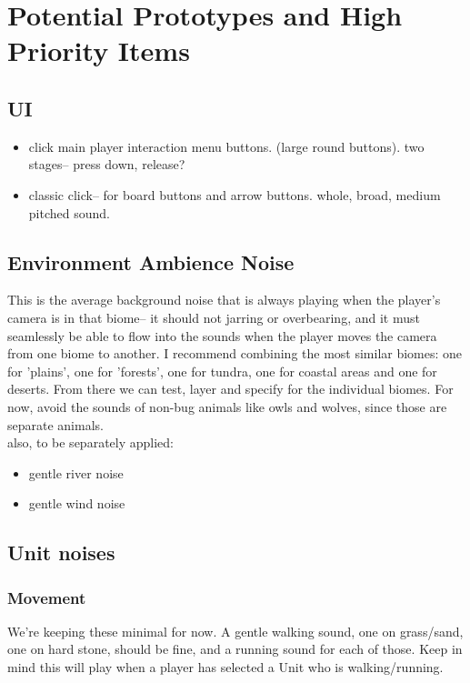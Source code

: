 \documentclass[11pt]{article}
\date{\today}
\title{}
\begin{document}
\tableofcontents

\section{Potential Prototypes and High Priority Items}
\label{sec:org356e512}
\subsection{UI}
\label{sec:org8768f0b}
\begin{itemize}
\item click main player interaction menu buttons. (large round buttons). two stages-- press down, release?\\
\item classic click-- for board buttons and arrow buttons. whole, broad, medium pitched sound.\\
\end{itemize}
\subsection{Environment Ambience Noise}
\label{sec:orge4248ec}
This is the average background noise that is always playing when the player's camera is in that biome-- it should not jarring or overbearing, and it must seamlessly be able to flow into the sounds when the player moves the camera from one biome to another. I recommend combining the most similar biomes: one for 'plains', one for 'forests', one for tundra, one for coastal areas and one for deserts.  From there we can test, layer and specify for the individual biomes. For now, avoid the sounds of non-bug animals like owls and wolves, since those are separate animals.\\

also, to be separately applied:\\
\begin{itemize}
\item[{$\square$}] gentle river noise\\
\item[{$\square$}] gentle wind noise\\
\end{itemize}
\subsection{Unit noises}
\label{sec:org6184ef8}
\subsubsection{Movement}
\label{sec:org51970b0}
We're keeping these minimal for now. A gentle walking sound, one on grass/sand, one on hard stone, should be fine, and a running sound for each of those. Keep in mind this will play when a player has selected a Unit who is walking/running.\\
\end{document}
